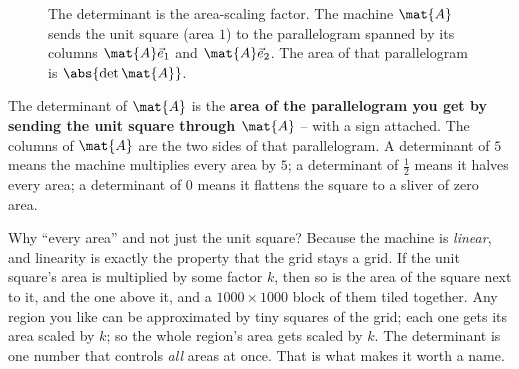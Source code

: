 \begin{figure}[H]
\centering
{}
\caption{The determinant is the area-scaling factor. The machine $\mat{A}$ sends
the unit square (area $1$) to the parallelogram spanned by its columns
$\mat{A}\vec{e}_1$ and $\mat{A}\vec{e}_2$. The area of that parallelogram is
$\abs{\det\mat{A}}$.}
\label{ch21:fig-unitbox}
\end{figure}

\begin{intuitionbox}
The determinant of $\mat{A}$ is the \textbf{area of the parallelogram you get by
sending the unit square through $\mat{A}$} -- with a sign attached. The columns of
$\mat{A}$ are the two sides of that parallelogram. A determinant of $5$ means the
machine multiplies every area by $5$; a determinant of $\tfrac{1}{2}$ means it
halves every area; a determinant of $0$ means it flattens the square to a sliver
of zero area.
\end{intuitionbox}

Why ``every area'' and not just the unit square? Because the machine is
\emph{linear}, and linearity is exactly the property that the grid stays a grid.
If the unit square's area is multiplied by some factor $k$, then so is the area of
the square next to it, and the one above it, and a $1000\times 1000$ block of
them tiled together. Any region you like can be approximated by tiny squares of
the grid; each one gets its area scaled by $k$; so the whole region's area gets
scaled by $k$. The determinant is one number that controls \emph{all} areas at
once. That is what makes it worth a name.


